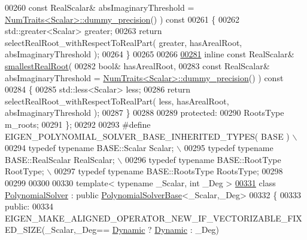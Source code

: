\begin{DoxyCode}
00260         \textcolor{keyword}{const} RealScalar& absImaginaryThreshold = 
      \hyperlink{group___core___module_struct_eigen_1_1_num_traits}{NumTraits<Scalar>::dummy\_precision}() )\textcolor{keyword}{ const}
00261 \textcolor{keyword}{    }\{
00262       std::greater<Scalar> greater;
00263       \textcolor{keywordflow}{return} selectRealRoot\_withRespectToRealPart( greater, hasArealRoot, absImaginaryThreshold );
00264     \}
00265 
00266 
\hyperlink{class_eigen_1_1_polynomial_solver_base_a24b054cdf82a8e9409bea47c3c05c756}{00281}     \textcolor{keyword}{inline} \textcolor{keyword}{const} RealScalar& \hyperlink{class_eigen_1_1_polynomial_solver_base_a24b054cdf82a8e9409bea47c3c05c756}{smallestRealRoot}(
00282         \textcolor{keywordtype}{bool}& hasArealRoot,
00283         \textcolor{keyword}{const} RealScalar& absImaginaryThreshold = 
      \hyperlink{group___core___module_struct_eigen_1_1_num_traits}{NumTraits<Scalar>::dummy\_precision}() )\textcolor{keyword}{ const}
00284 \textcolor{keyword}{    }\{
00285       std::less<Scalar> less;
00286       \textcolor{keywordflow}{return} selectRealRoot\_withRespectToRealPart( less, hasArealRoot, absImaginaryThreshold );
00287     \}
00288 
00289   \textcolor{keyword}{protected}:
00290     RootsType               m\_roots;
00291 \};
00292 
00293 \textcolor{preprocessor}{#define EIGEN\_POLYNOMIAL\_SOLVER\_BASE\_INHERITED\_TYPES( BASE )  \(\backslash\)}
00294 \textcolor{preprocessor}{  typedef typename BASE::Scalar                 Scalar;       \(\backslash\)}
00295 \textcolor{preprocessor}{  typedef typename BASE::RealScalar             RealScalar;   \(\backslash\)}
00296 \textcolor{preprocessor}{  typedef typename BASE::RootType               RootType;     \(\backslash\)}
00297 \textcolor{preprocessor}{  typedef typename BASE::RootsType              RootsType;}
00298 
00299 
00300 
00330 \textcolor{keyword}{template}< \textcolor{keyword}{typename} \_Scalar, \textcolor{keywordtype}{int} \_Deg >
\hyperlink{class_eigen_1_1_polynomial_solver}{00331} \textcolor{keyword}{class }\hyperlink{class_eigen_1_1_polynomial_solver}{PolynomialSolver} : \textcolor{keyword}{public} \hyperlink{class_eigen_1_1_polynomial_solver_base}{PolynomialSolverBase}<\_Scalar,\_Deg>
00332 \{
00333   \textcolor{keyword}{public}:
00334     EIGEN\_MAKE\_ALIGNED\_OPERATOR\_NEW\_IF\_VECTORIZABLE\_FIXED\_SIZE(\_Scalar,\_Deg==
      \hyperlink{namespace_eigen_ad81fa7195215a0ce30017dfac309f0b2}{Dynamic} ? \hyperlink{namespace_eigen_ad81fa7195215a0ce30017dfac309f0b2}{Dynamic} : \_Deg)

\end{DoxyCode}

